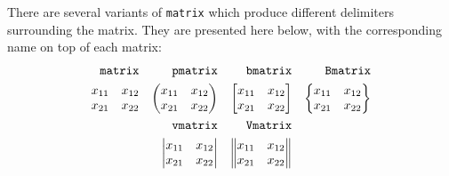 	There are several variants of \texttt{matrix} which produce different delimiters surrounding the matrix.
	They are presented here below, with the corresponding name on top of each matrix:
	\begin{align*}
		\text{\texttt{matrix}} && \text{\texttt{pmatrix}} && \text{\texttt{bmatrix}} && \text{\texttt{Bmatrix}} \\
		\begin{matrix}
			x_{11} & x_{12} \\
			x_{21} & x_{22} \\
		\end{matrix} 
		&&
		\begin{pmatrix}
			x_{11} & x_{12} \\
			x_{21} & x_{22} \\
		\end{pmatrix}
		&&
		\begin{bmatrix}
			x_{11} & x_{12} \\
			x_{21} & x_{22} \\
		\end{bmatrix}
		&&
		\begin{Bmatrix}
			x_{11} & x_{12} \\
			x_{21} & x_{22} \\
		\end{Bmatrix} \\
		&& \text{\texttt{vmatrix}} && \text{\texttt{Vmatrix}} && \\
		&&
		\begin{vmatrix}
			x_{11} & x_{12} \\
			x_{21} & x_{22} \\
		\end{vmatrix}
		&&
		\begin{Vmatrix}
			x_{11} & x_{12} \\
			x_{21} & x_{22} \\
		\end{Vmatrix}
		&& 
	\end{align*}
	
